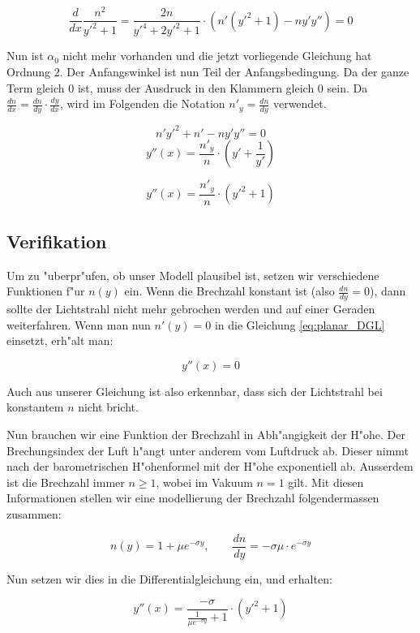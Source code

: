 \begin{refsection}
$$\frac{d}{dx} \frac{n^2}{y'^2 + 1}  = \frac{2n}{y'^4 + 2y'^2 + 1} \cdot \left( n'(y'^2 + 1) - n y' y'' \right) = 0$$

Nun ist $\alpha_0$ nicht mehr vorhanden und die jetzt vorliegende Gleichung hat Ordnung 2. 
Der Anfangswinkel ist nun Teil der Anfangsbedingung. 
Da der ganze Term gleich 0 ist, muss der Ausdruck in den Klammern gleich 0 sein.
Da $\frac{dn}{dx} = \frac{dn}{dy} \cdot \frac{dy}{dx}$, wird im Folgenden die Notation $n'_y = \frac{dn}{dy}$ verwendet.

$$n' y'^2 + n' - n y' y'' = 0$$
$$y''(x) = \frac{n'_y}{n} \cdot \left( y' + \frac{1}{y'} \right)$$

\begin{equation} \label{eq:planar_DGL}
y''(x) = \frac{n'_y}{n} \cdot \left( y'^2 + 1\right)
\end{equation}

\subsection{Verifikation}
Um zu "uberpr"ufen, ob unser Modell plausibel ist, setzen wir verschiedene Funktionen f"ur $n(y)$ ein. 
Wenn die Brechzahl konstant ist (also $\frac{dn}{dy} = 0$), dann sollte der Lichtstrahl nicht mehr gebrochen werden und auf einer Geraden weiterfahren. 
Wenn man nun $n'(y)=0$ in die Gleichung \ref{eq:planar_DGL} einsetzt, erh"alt man: 

$$y''(x) = 0$$

Auch aus unserer Gleichung ist also erkennbar, dass sich der Lichtstrahl bei konstantem $n$ nicht bricht.

Nun brauchen wir eine Funktion der Brechzahl in Abh"angigkeit der H"ohe. 
Der Brechungsindex der Luft h"angt unter anderem vom Luftdruck ab. 
Dieser nimmt nach der barometrischen H"ohenformel mit der H"ohe exponentiell ab.
Ausserdem ist die Brechzahl immer $n \geq 1$, wobei im Vakuum $n=1$ gilt. 
Mit diesen Informationen stellen wir eine modellierung der Brechzahl folgendermassen zusammen:

$$n(y) = 1 + \mu e^{- \sigma y}, \qquad \frac{dn}{dy} = -\sigma \mu \cdot e^{-\sigma y}$$

Nun setzen wir dies in die Differentialgleichung ein, und erhalten:

\begin{equation} \label{eq:planar_DGL_n}
y''(x) = \frac{-\sigma}{\displaystyle\frac{1}{\mu e^{-\sigma y}} + 1} \cdot \left( y'^2 + 1 \right)
\end{equation}


\end{refsection}
